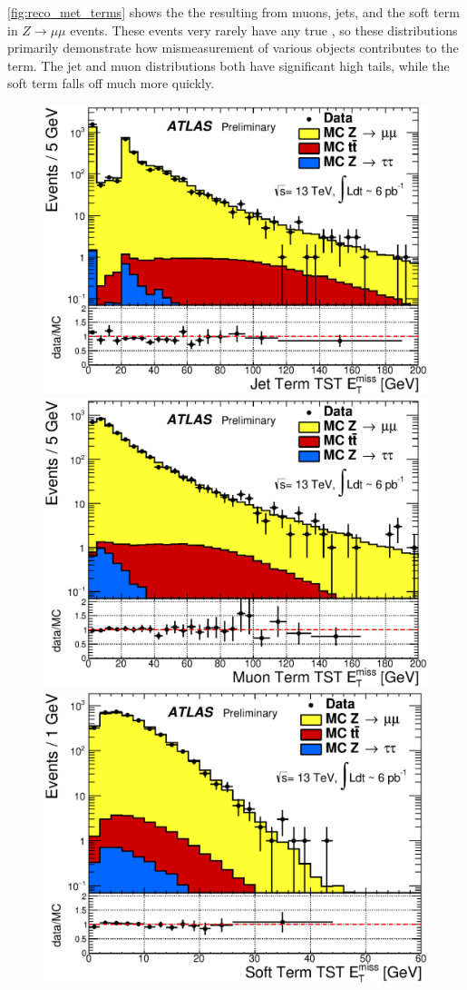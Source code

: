 \autoref{fig:reco_met_terms} shows the the \met resulting from muons, jets, and the soft term in $Z\rightarrow\mu\mu$ events. These events very rarely have any true \met, so these distributions primarily demonstrate how mismeasurement of various objects contributes to the \met term. The jet and muon distributions both have significant high tails, while the soft term falls off much more quickly. 

\begin{centering}
\begin{figure}[!hbt]
\myfloatalign
\includegraphics[width=.9\linewidth]{figures/reco/met_fig_02a.eps}
\includegraphics[width=.9\linewidth]{figures/reco/met_fig_02b.eps}
\includegraphics[width=.9\linewidth]{figures/reco/met_fig_02c.eps}

\end{figure}
\end{centering}
